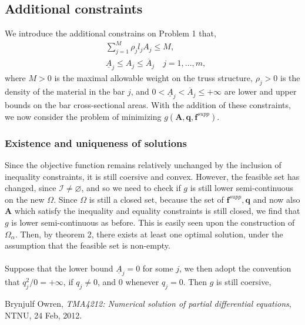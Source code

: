 \documentclass[10pt,a4paper]{article}
\begin{document}
\subsection{Additional constraints}
We introduce the additional constrains on Problem 1 that,
\begin{align}
\label{problem2}
&\sum_{j=1}^M \rho_j l_j A_j \leq M,\\
&\underline{A}_j \leq A_j \leq \overline{A}_j \quad j=1,...,m,
\end{align}
where $M > 0$ is the maximal allowable weight on the truss structure, $\rho_j > 0$ is the density of the material in the bar $j$, and $0 < \underline{A}_j <\overline{A}_j \leq +\infty$ are lower and upper bounds on the bar cross-sectional areas. With the addition of these constraints, we now consider the problem of minimizing $g(\boldsymbol{A},\boldsymbol{q},\boldsymbol{f}^{supp})$.
\subsubsection{Existence and uniqueness of solutions}
Since the objective function remains relatively unchanged by the inclusion of inequality constraints, it is still coersive and convex. However, the feasible set has changed, since $\mathcal{I} \neq \varnothing$, and so we need to check if $g$ is still lower semi-continuous on the new $\Omega$. Since $\Omega$ is still a closed set, because the set of $\boldsymbol{f}^{supp},\boldsymbol{q}$ and now also $\boldsymbol{A}$ which satisfy the inequality and equality constraints is still closed, we find that $g$ is lower semi-continuous as before. This is easily seen upon the construction of $\Omega_\alpha$. Then, by theorem 2, there exists at least one optimal solution, under the assumption that the feasible set is non-empty.
\\\\
Suppose that the lower bound $\underline{A}_j=0$ for some $j$, we then adopt the convention that $q_j^2/0 = +\infty$, if $q_j\neq0$, and $0$ whenever $q_j=0$. Then $g$ is still coersive,
\begin{thebibliography}{2}
Brynjulf Owren, \emph{TMA4212: Numerical solution of partial differential equations}, NTNU, 24 Feb, 2012.
\end{thebibliography}
\end{document}
